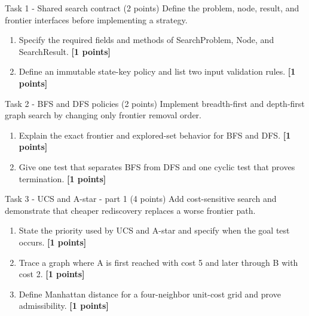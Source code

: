 \documentclass[aspectratio=169,11pt]{beamer}
\begin{document}
\begin{frame}{Task 1 - Shared search contract (2 points)}
\small
Define the problem, node, result, and frontier interfaces before implementing a strategy.

\vspace{0.2cm}
\begin{enumerate}
\item[\textbf{a.}] Specify the required fields and methods of SearchProblem, Node, and SearchResult. \hfill{\color{courseblue}\textbf{[1 points]}}
\item[\textbf{b.}] Define an immutable state-key policy and list two input validation rules. \hfill{\color{courseblue}\textbf{[1 points]}}
\end{enumerate}
\end{frame}

\begin{frame}{Task 2 - BFS and DFS policies (2 points)}
\small
Implement breadth-first and depth-first graph search by changing only frontier removal order.

\vspace{0.2cm}
\begin{enumerate}
\item[\textbf{a.}] Explain the exact frontier and explored-set behavior for BFS and DFS. \hfill{\color{courseblue}\textbf{[1 points]}}
\item[\textbf{b.}] Give one test that separates BFS from DFS and one cyclic test that proves termination. \hfill{\color{courseblue}\textbf{[1 points]}}
\end{enumerate}
\end{frame}

\begin{frame}{Task 3 - UCS and A-star - part 1 (4 points)}
\small
Add cost-sensitive search and demonstrate that cheaper rediscovery replaces a worse frontier path.

\vspace{0.2cm}
\begin{enumerate}
\item[\textbf{a.}] State the priority used by UCS and A-star and specify when the goal test occurs. \hfill{\color{courseblue}\textbf{[1 points]}}
\item[\textbf{b.}] Trace a graph where A is first reached with cost 5 and later through B with cost 2. \hfill{\color{courseblue}\textbf{[1 points]}}
\item[\textbf{c.}] Define Manhattan distance for a four-neighbor unit-cost grid and prove admissibility. \hfill{\color{courseblue}\textbf{[1 points]}}
\end{enumerate}
\end{frame}
\end{document}
